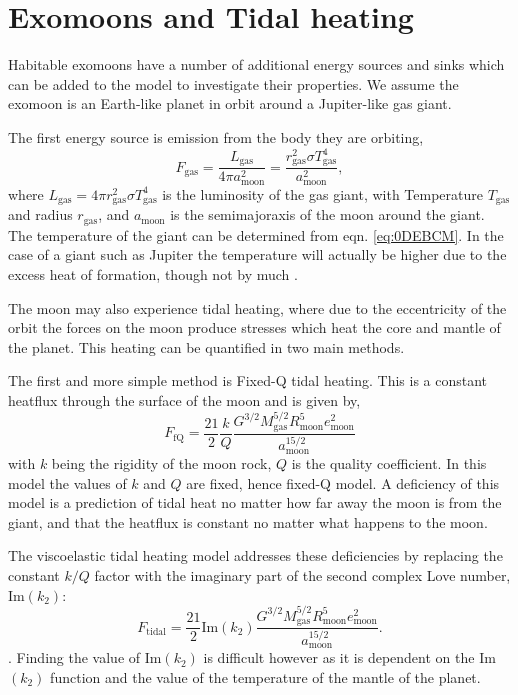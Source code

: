 \documentclass[12pt, onecolumn]{revtex4-2}    %
\begin{document}
\section{Exomoons and Tidal heating} \label{sec:tidal_heating}


Habitable exomoons have a number of additional energy sources and sinks which can be added to the model to investigate their properties.
We assume the exomoon is an Earth-like planet in orbit around a Jupiter-like gas giant.

The first energy source is emission from the body they are orbiting,
\begin{equation}
    F_{\text{gas}} = \frac{L_{\text{gas}}}{4 \pi a_{\text{moon}}^2} = \frac{r_{\text{gas}}^2 \sigma T_{\text{gas}}^4}{a_{\text{moon}}^2},
\end{equation}
where $L_{\text{gas}} = 4 \pi r_{\text{gas}}^2 \sigma T_{\text{gas}}^4$ is the luminosity of the gas giant, with Temperature $T_{\text{gas}}$ and radius $r_{\text{gas}}$, and $a_{\text{moon}}$ is the semimajoraxis of the moon around the giant.
The temperature of the giant can be determined from eqn. \eqref{eq:0DEBCM}.
In the case of a giant such as Jupiter the temperature will actually be higher due to the excess heat of formation, though not by much \cite{LJW2018}.

The moon may also experience tidal heating, where due to the eccentricity of the orbit the forces on the moon produce stresses which heat the core and mantle of the planet.
This heating can be quantified in two main methods.

The first and more simple method is Fixed-Q tidal heating.
This is a constant heatflux through the surface of the moon and is given by,
\begin{equation}
    F_{\text{fQ}} = \frac{21}{2} \frac{k}{Q} \frac{G^{3/2}M_{\text{gas}}^{5/2}R_{\text{moon}}^5 e_{\text{moon}}^2} {a_{\text{moon}}^{15/2}}
\end{equation} %
with $k$ being the rigidity of the moon rock, $Q$ is the quality coefficient.
In this model the values of $k$ and $Q$ are fixed, hence fixed-Q model.
A deficiency of this model is a prediction of tidal heat no matter how far away the moon is from the giant, and that the heatflux is constant no matter what happens to the moon.

The viscoelastic tidal heating model addresses these deficiencies by replacing the constant $k/Q$ factor with the imaginary part of the second complex Love number, $\text{Im}(k_2)$:
\begin{equation}
    F_{\text{tidal}} = \frac{21}{2} \text{Im}(k_2) \frac{G^{3/2}M_{\text{gas}}^{5/2}R_{\text{moon}}^5 e_{\text{moon}}^2} {a_{\text{moon}}^{15/2}}.
\end{equation} \cite{YP1981} \cite{Segatz1988} \cite{DHT2015}.
Finding the value of $\text{Im}(k_2)$ is difficult however as it is dependent on the Im$(k_2)$ function and the value of the temperature of the mantle of the planet.
\end{document}
